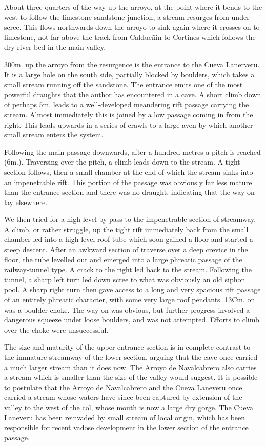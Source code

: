 \documentclass[11pt, a4paper, twoside]{memoir}
\begin{document}
About three quarters of the way up the arroyo, at the point where it bends to the west to follow the limestone-sandstone junction, a stream resurges from under scree. This flows northwards down the arroyo to sink again where it crosses on to limestone, not far above the track from Caldueñin to Cortines which follows the dry river bed in the main valley.

300m. up the arroyo from the resurgence is the entrance to the Cueva Lanerveru. It is a large hole on the south side, partially blocked by boulders, which takes a small stream running off the sandstone. The entrance emits one of the most powerful draughts that the author has encountered in a cave. A short climb down of perhaps 5m. leads to a well-developed meandering rift passage carrying the stream. Almost immediately this is joined by a low passage coming in from the right. This leads upwards in a series of crawls to a large aven by which another small stream enters the system.

Following the main passage downwards, after a hundred metres a pitch is reached (6m.). Traversing over the pitch, a climb leads down to the stream. A tight section follows, then a small chamber at the end of which the stream sinks into an impenetrable rift. This portion of the passage was obviously far less mature than the entrance section and there was no draught, indicating that the way on lay elsewhere.

We then tried for a high-level by-pass to the impenetrable section of streamway. A climb, or rather struggle, up the tight rift immediately back from the small chamber led into a high-level roof tube which soon gained a floor and started a steep descent. After an awkward section of traverse over a deep crevice in the floor, the tube levelled out and emerged into a large phreatic passage of the railway-tunnel type. A crack to the right led back to the stream. Following the tunnel, a sharp left turn led down scree to what was obviously an old siphon pool. A sharp right turn then gave access to a long and very spacious rift passage of an entirely phreatic character, with some very large roof pendants. 13Cm. on was a boulder choke. The way on was obvious, but further progress involved a dangerous squeeze under loose boulders, and was not attempted. Efforts to climb over the choke were unsuccessful.

The size and maturity of the upper entrance section is in complete contrast to the immature streamway of the lower section, arguing that the cave once carried a much larger stream than it does now. The Arroyo de Navalcabrero also carries a stream which is smaller than the size of the valley would suggest. It is possible to postulate that the Arroyo de Navalcabrero and the Cueva Laneveru once carried a stream whose waters have since been captured by extension of the valley to the west of the col, whose mouth is now a large dry gorge. The Cueva Laneveru has been reinvaded by small stream of local origin, which has been responsible for recent vadose development in the lower section of the entrance passage.
\end{document}
